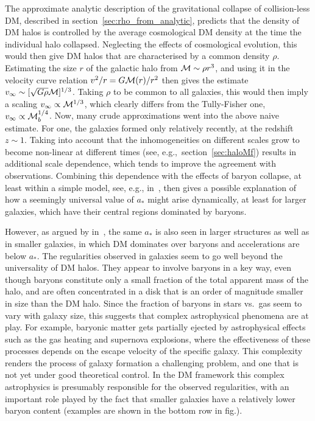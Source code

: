 The approximate analytic description of the gravitational collapse of collision-less DM, described in section~\ref{sec:rho_from_analytic}, 
predicts that the density 
of DM halos is 
controlled by the average cosmological DM density at the time the individual halo collapsed.
Neglecting the effects of cosmological evolution, this would then give DM halos that are characterised by a common density $\rho$.
Estimating the size $r$ of the galactic halo  from ${\cal M}\sim\rho r^3$, and using it in the velocity curve relation 
$v^2/r = G{\cal M}(r)/r^2$ then gives the estimate
$v_\infty  \sim [\sqrt{G\rho} {\cal M}]^{1/3}$. Taking $\rho$ to be common to all galaxies, this would then imply a scaling $v_\infty  \propto {\cal M}^{1/3}$, which clearly differs from
the Tully-Fisher one, $v_\infty \propto {\cal M}_b^{1/4}$.
Now, many crude approximations went into the above naive estimate. For one, the galaxies formed only relatively recently, at the redshift $z\sim 1$.
Taking into account that the inhomogeneities on different scales grow to become non-linear
at different times
(see, e.g.,\ section~\ref{sec:haloMf}) results in additional scale dependence, which tends to improve the agreement with observations.
Combining this dependence with the effects of baryon collapse, at least within a simple model, see, e.g.,  in~\cite{DMvsa0},
then gives a possible explanation of how a seemingly universal value of $a_*$  might arise dynamically, at least for larger galaxies, which have their central regions
dominated by baryons.



However, as argued by  in~\cite{DMvsa0},
the same $a_*$ is also seen in larger structures as well as in smaller galaxies, 
in which DM  dominates over baryons and accelerations are below $a_*$.
The regularities observed in galaxies seem to go well beyond the universality of DM halos.
They appear to involve baryons in a key way, even though baryons constitute only a small fraction of the total apparent mass of the halo, and are often concentrated in a disk that is an order of magnitude smaller in size than the DM halo. 
Since the fraction of baryons in stars vs.~gas seem to vary with galaxy size,  
this suggests that complex astrophysical phenomena are at play.
For example, baryonic matter gets partially ejected by astrophysical effects such as the gas heating and supernova explosions, where the effectiveness of these processes
depends on the escape velocity of the specific galaxy. 
This complexity renders the process of galaxy formation a challenging problem, and one that is not yet under good theoretical control. 
In the DM framework this complex astrophysics is presumably responsible for the observed regularities, with an important role played by
 the fact that smaller galaxies have a relatively lower baryon content
(examples are shown in the bottom row in fig.).

